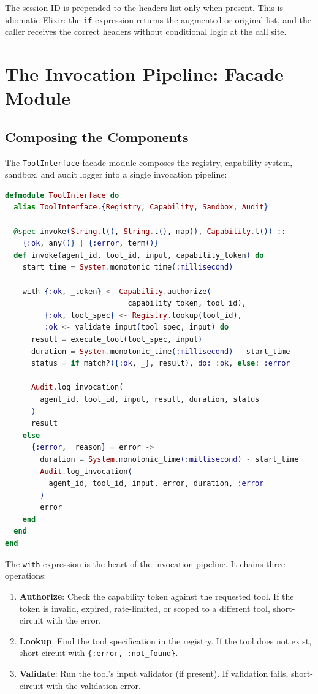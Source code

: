 \documentclass[12pt,a4paper]{article}
\theoremstyle{plain}
\theoremstyle{definition}
\begin{document}
The session ID is prepended to the headers list only when present. This is idiomatic Elixir: the \texttt{if} expression returns the augmented or original list, and the caller receives the correct headers without conditional logic at the call site.


\section{The Invocation Pipeline: Facade Module}
\label{sec:facade}

\subsection{Composing the Components}

The \texttt{ToolInterface} facade module composes the registry, capability system, sandbox, and audit logger into a single invocation pipeline:

\begin{lstlisting}[language=elixir, caption={Complete tool invocation pipeline.}, label={lst:invoke}]
defmodule ToolInterface do
  alias ToolInterface.{Registry, Capability, Sandbox, Audit}

  @spec invoke(String.t(), String.t(), map(), Capability.t()) ::
    {:ok, any()} | {:error, term()}
  def invoke(agent_id, tool_id, input, capability_token) do
    start_time = System.monotonic_time(:millisecond)

    with {:ok, _token} <- Capability.authorize(
                            capability_token, tool_id),
         {:ok, tool_spec} <- Registry.lookup(tool_id),
         :ok <- validate_input(tool_spec, input) do
      result = execute_tool(tool_spec, input)
      duration = System.monotonic_time(:millisecond) - start_time
      status = if match?({:ok, _}, result), do: :ok, else: :error

      Audit.log_invocation(
        agent_id, tool_id, input, result, duration, status
      )
      result
    else
      {:error, _reason} = error ->
        duration = System.monotonic_time(:millisecond) - start_time
        Audit.log_invocation(
          agent_id, tool_id, input, error, duration, :error
        )
        error
    end
  end
end
\end{lstlisting}

The \texttt{with} expression is the heart of the invocation pipeline. It chains three operations:

\begin{enumerate}[leftmargin=2em]
\item \textbf{Authorize}: Check the capability token against the requested tool. If the token is invalid, expired, rate-limited, or scoped to a different tool, short-circuit with the error.
\item \textbf{Lookup}: Find the tool specification in the registry. If the tool does not exist, short-circuit with \texttt{\{:error, :not\_found\}}.
\item \textbf{Validate}: Run the tool's input validator (if present). If validation fails, short-circuit with the validation error.
\end{enumerate}
\end{document}
